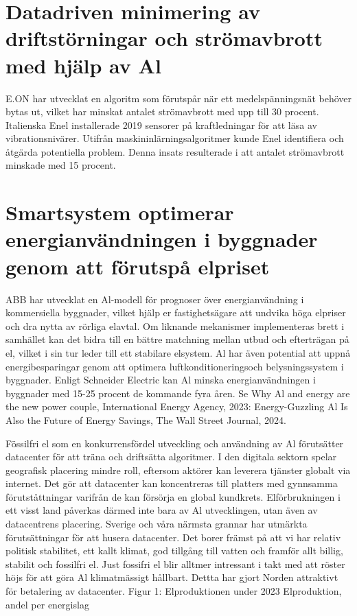 {{{\section*{Datadriven minimering av driftstörningar och strömavbrott med hjälp av Al}
E.ON har utvecklat en algoritm som förutspår när ett medelspänningsnät behöver bytas ut, vilket har minskat antalet strömavbrott med upp till 30 procent. Italienska Enel installerade 2019 sensorer på kraftledningar för att läsa av vibrationsnivärer. Utifrån maskininlärningsalgoritmer kunde Enel identifiera och åtgärda potentiella problem. Denna insats resulterade i att antalet strömavbrott minskade med 15 procent.
\section*{Smartsystem optimerar energianvändningen i byggnader genom att förutspå elpriset}
ABB har utvecklat en Al-modell för prognoser över energianvändning i kommersiella byggnader, vilket hjälp er fastighetsägare att undvika höga elpriser och dra nytta av rörliga elavtal. Om liknande mekanismer implementeras brett i samhället kan det bidra till en bättre matchning mellan utbud och efterträgan på el, vilket i sin tur leder till ett stabilare elsystem. Al har även potential att uppnå energibesparingar genom att optimera luftkonditioneringsoch belysningssystem i byggnader. Enligt Schneider Electric kan Al minska energianvändningen i byggnader med 15-25 procent de kommande fyra åren.
Se Why Al and energy are the new power couple, International Energy Agency, 2023: Energy-Guzzling Al Is Also the Future of Energy Savings, The Wall Street Journal, 2024.

Fössilfri el som en konkurrensfördel utveckling och användning av Al förutsätter datacenter för att träna och driftsätta algoritmer. I den digitala sektorn spelar geografisk placering mindre roll, eftersom aktörer kan leverera tjänster globalt via internet. Det gör att datacenter kan koncentreras till platters med gynnsamma förutståttningar varifrån de kan försörja en global kundkrets. Elförbrukningen i ett visst land påverkas därmed inte bara av Al utvecklingen, utan även av datacentrens placering.
Sverige och våra närmsta grannar har utmärkta förutsättningar för att husera datacenter. Det borer främst på att vi har relativ politisk stabilitet, ett kallt klimat, god tillgång till vatten och framför allt billig, stabilit och fossilfri el. Just fossifri el blir alltmer intressant i takt med att röster höjs för att göra Al klimatmässigt hållbart. Dettta har gjort Norden attraktivt för betalering av datacenter.
Figur 1: Elproduktionen under 2023
Elproduktion, andel per energislag

}}}
